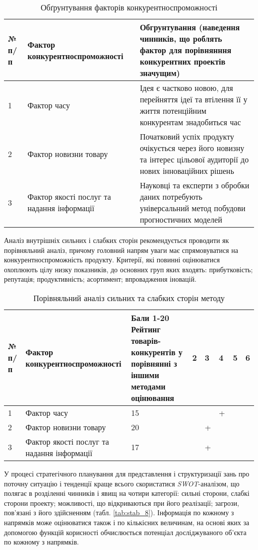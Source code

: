 \begin{table}[h!]
\fontsize{12pt}{12pt}\selectfont
	\begin{tabularx}{\textwidth}{|l|X|X|}
    \hline
    № п/п & Фактор конкурентноспроможності & Обгрунтування (наведення чинників, що роблять фактор для порівнянння конкурентних проектів значущим) \\ \hline
    1 & Фактор часу & Ідея є частково новою, для перейняття ідеї та втілення її у життя потенційним конкурентам знадобиться час \\ \hline
    2 & Фактор новизни товару & Початковий успіх продукту очікується через його новизну та інтерес цільової аудиторії до нових інноваційних рішень \\ \hline
    3 & Фактор якості послуг та надання інформації & Науковці та експерти з обробки даних потребують універсальний метод побудови прогностичних моделей \\
    \hline
    \end{tabularx}
\caption{Обґрунтування факторів конкурентноспроможності} \label{tab:stab_6}
\end{table}

Аналіз внутрішніх сильних і слабких сторін рекомендується проводити як порівняльний аналіз, причому головний напрям уваги має спрямовуватися на конкурентноспроможність продукту. Критерії, які повинні оцінюватися охоплюють цілу низку показників, до основних груп яких входять: прибутковість; репутація; продуктивність; асортимент; впровадження іновацій.

\begin{table}[h!]
\fontsize{12pt}{12pt}\selectfont
	\begin{tabularx}{\textwidth}{|l|X|X|X|X|X|X|X|}
    \hline
    № п/п & Фактор конкурентноспроможності & Бали 1-20 Рейтинг товарів-конкурентів у порівнянні з іншими методами оцінювання & 2 & 3 & 4 & 5 & 6 \\ \hline
    1 & Фактор часу & 15 & & & + & & \\ \hline
    2 & Фактор новизни товару & 20 & & + & & & \\ \hline
    3 & Фактор якості послуг та надання інформації & 17 & & + & & & \\
    \hline
    \end{tabularx}
\caption{Порівняльний аналіз сильних та слабких сторін методу} \label{tab:stab_7}
\end{table}

У процесі стратегічного планування для представлення і структуризації зань про поточну ситуацію і тенденції  краще всього скористатися \textit{SWOT}-аналізом, що полягає в розділенні чинників і явищ на чотири категорії: сильні сторони, слабкі сторони проекту; можливості, що відкриваються при його реалізації; загрози, пов'язані з його здійсненням (табл. \ref{tab:stab_8}). Інформація по кожному з напрямків може оцінюватися також і по кількісних величинам, на основі яких за допомогою функцій корисності обчислюється потенціал досліджуваного об'єкта по кожному з напрямків.

